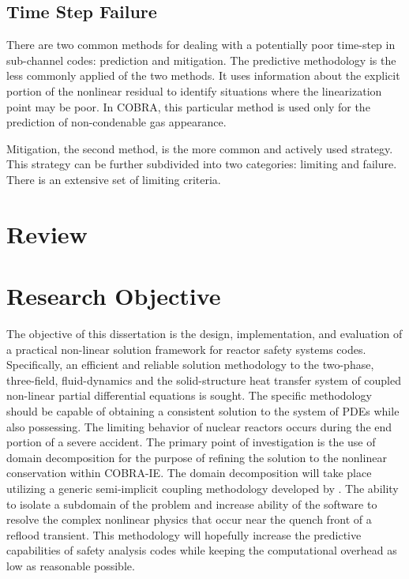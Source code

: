 \subsection{Time Step Failure}
\label{subsect:time_step_failure}
There are two common methods for dealing with a potentially poor time-step in sub-channel codes: prediction and mitigation.
The predictive methodology is the less commonly applied of the two methods.
It uses information about the explicit portion of the nonlinear residual to identify situations where the linearization point may be poor.
In COBRA, this particular method is used only for the prediction of non-condenable gas appearance.

Mitigation, the second method, is the more common and actively used strategy.
This strategy can be further subdivided into two categories: limiting and failure.
There is an extensive set of limiting criteria.

\section{Review}
\label{sect:review}

\section{Research Objective}
The objective of this dissertation is the design, implementation, and evaluation of a practical non-linear solution framework for reactor safety systems codes.
Specifically, an efficient and reliable solution methodology to the two-phase, three-field, fluid-dynamics and the solid-structure heat transfer system of coupled non-linear partial differential equations is sought.
The specific methodology should be capable of obtaining a consistent solution to the system of PDEs while also possessing. \cite{Aktas1996}
The limiting behavior of nuclear reactors occurs during the end portion of a severe accident.
The primary point of investigation is the use of domain decomposition for the purpose of refining the solution to the nonlinear conservation within COBRA-IE.
The domain decomposition will take place utilizing a generic semi-implicit coupling methodology developed by \citet{Weaver2002}.
The ability to isolate a subdomain of the problem and increase ability of the software to resolve the complex nonlinear physics that occur near the quench front of a reflood transient.
This methodology will hopefully increase the predictive capabilities of safety analysis codes while keeping the computational overhead as low as reasonable possible.